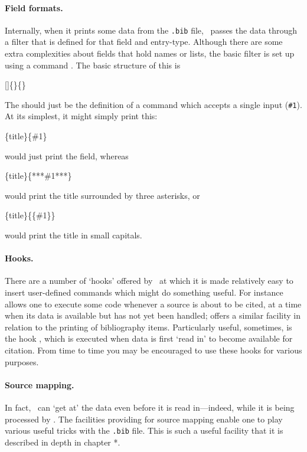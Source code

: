 \paragraph{Field formats.} Internally, when it prints some data from
the \verb|.bib| file, \biblatex\ passes the data through a filter that
is defined for that field and entry-type. Although there are some
extra complexities about fields that hold names or lists, the basic
filter is set up using a command . The basic
structure of this is
\begin{pseudoverb}
[]\{\}\{\}
\end{pseudoverb}
The  should just be the definition of a command which
accepts a single input (\texttt{\#1}). At its simplest, it
might simply print this:
\begin{pseudoverb}
\{title\}\{\#1\}
\end{pseudoverb}
would just print the field, whereas
\begin{pseudoverb}
\{title\}\{***\#1***\}
\end{pseudoverb}
would print the title surrounded by three asterisks, or
\begin{pseudoverb}
\{title\}\{\{\#1\}\}
\end{pseudoverb}
would print the title in small capitals.

\paragraph{Hooks.} There are a number of `hooks' offered by \biblatex\
at which it is made relatively easy to insert user-defined commands
which might do something useful. For instance \cs{AtEveryCitekey} allows
one to execute some code whenever a source is about to be cited, at a
time when its data is available but has not yet been handled;
 offers a similar facility in relation to the
printing of bibliography items. Particularly useful, sometimes, is the
hook \cs{AtDataInput}, which is executed when data is first `read in'
to become available for citation. From time to time you may be
encouraged to use these hooks for various purposes.

\paragraph{Source mapping.} In fact, \biblatex\ can `get at' the data
even before it is read in---indeed, while it is being processed by
\package{biber}. The facilities providing for source mapping enable
one to play various useful tricks with the \verb|.bib| file. This is
such a useful facility that it is described in depth in chapter *.

